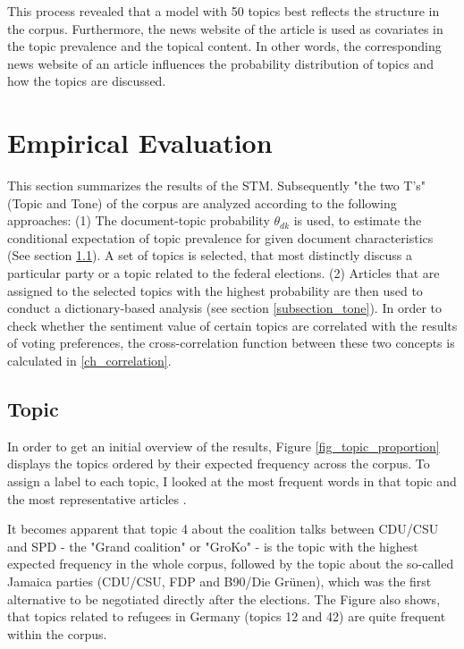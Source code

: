 \documentclass[12pt,a4paper,notitlepage]{article}
\begin{document}
This process revealed that a model with 50 topics best reflects the structure in the corpus. Furthermore, the news website of the article is used as covariates in the topic prevalence and the topical content. In other words, the corresponding news website of an article influences the probability distribution of topics and how the topics are discussed. 

\section{Empirical Evaluation}\label{ch_empirical}

This section summarizes the results of the STM. Subsequently "the two T's" (Topic and Tone) of the corpus are analyzed according to the following approaches: (1) The document-topic probability $\theta_{dk}$ is used, to estimate the conditional expectation of topic prevalence for given document characteristics (See section \ref{subsection_topic}). A set of topics is selected, that most distinctly discuss a particular party or a topic related to the federal elections. (2) Articles that are assigned to the selected topics with the highest probability are then used to conduct a dictionary-based analysis (see section \ref{subsection_tone}). In order to check whether the sentiment value of certain topics are correlated with the results of voting preferences, the cross-correlation function between these two concepts is calculated in \ref{ch_correlation}.

\subsection{Topic}\label{subsection_topic}

In order to get an initial overview of the results, Figure \ref{fig_topic_proportion} displays the topics ordered by their expected frequency across the corpus. To assign a label to each topic, I looked at the most frequent words in that topic and the most representative articles \citep{roberts_model_2016}. 

It becomes apparent that topic 4 about the coalition talks between CDU/CSU and SPD - the "Grand coalition" or "GroKo" - is the topic with the highest expected frequency in the whole corpus, followed by the topic about the so-called Jamaica parties (CDU/CSU, FDP and B90/Die Grünen), which was the first alternative to be negotiated directly after the elections. The Figure also shows, that topics related to refugees in Germany (topics 12 and 42) are quite frequent within the corpus. 
\end{document}
